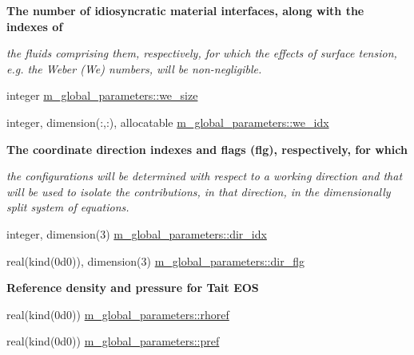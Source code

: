 \begin{Indent}\textbf{ The number of idiosyncratic material interfaces, along with the indexes of}\par
{\em the fluids comprising them, respectively, for which the effects of surface tension, e.\+g. the Weber (We) numbers, will be non-\/negligible. }\begin{DoxyCompactItemize}
\item 
integer \hyperlink{namespacem__global__parameters_af329319354912b90787e0dff7cdc8a37}{m\+\_\+global\+\_\+parameters\+::we\+\_\+size}
\item 
integer, dimension(\+:,\+:), allocatable \hyperlink{namespacem__global__parameters_a0d20192b0175dc677ba88b14bf0d5104}{m\+\_\+global\+\_\+parameters\+::we\+\_\+idx}
\end{DoxyCompactItemize}
\end{Indent}
\begin{Indent}\textbf{ The coordinate direction indexes and flags (flg), respectively, for which}\par
{\em the configurations will be determined with respect to a working direction and that will be used to isolate the contributions, in that direction, in the dimensionally split system of equations. }\begin{DoxyCompactItemize}
\item 
integer, dimension(3) \hyperlink{namespacem__global__parameters_a5c017ac8b7bf0d36b4b3b88efe5ffc5f}{m\+\_\+global\+\_\+parameters\+::dir\+\_\+idx}
\item 
real(kind(0d0)), dimension(3) \hyperlink{namespacem__global__parameters_a9dc07be63393049ae70d9dceeff403e9}{m\+\_\+global\+\_\+parameters\+::dir\+\_\+flg}
\end{DoxyCompactItemize}
\end{Indent}
\begin{Indent}\textbf{ Reference density and pressure for Tait E\+OS}\par
\begin{DoxyCompactItemize}
\item 
real(kind(0d0)) \hyperlink{namespacem__global__parameters_a485a360d73013d7bce1daa01df404534}{m\+\_\+global\+\_\+parameters\+::rhoref}
\item 
real(kind(0d0)) \hyperlink{namespacem__global__parameters_aae2170af8a68c7dcdd91910aad867ef4}{m\+\_\+global\+\_\+parameters\+::pref}
\end{DoxyCompactItemize}
\end{Indent}
